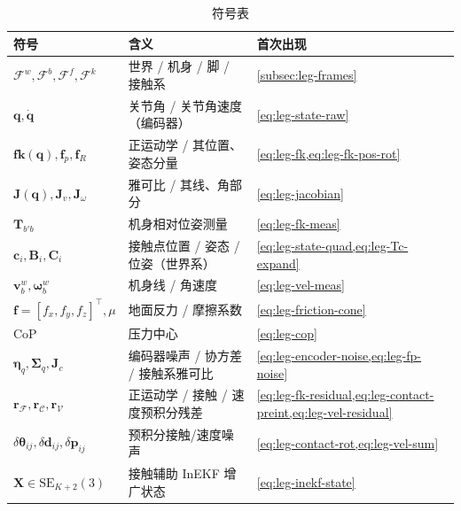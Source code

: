 \begin{table}[H]\centering\small
\caption{符号表}
\begin{tabular}{lll}
\toprule
符号 & 含义 & 首次出现 \\
\midrule
$\mathcal{F}^w,\mathcal{F}^b,\mathcal{F}^f,\mathcal{F}^k$ & 世界 / 机身 / 脚 / 接触系 & \cref{subsec:leg-frames} \\
$\mathbf{q},\dot{\mathbf{q}}$ & 关节角 / 关节角速度（编码器） & \cref{eq:leg-state-raw} \\
$\mathbf{fk}(\mathbf{q}),\mathbf{f}_p,\mathbf{f}_R$ & 正运动学 / 其位置、姿态分量 & \cref{eq:leg-fk,eq:leg-fk-pos-rot} \\
$\mathbf{J}(\mathbf{q}),\mathbf{J}_v,\mathbf{J}_\omega$ & 雅可比 / 其线、角部分 & \cref{eq:leg-jacobian} \\
$\mathbf{T}_{b'b}$ & 机身相对位姿测量 & \cref{eq:leg-fk-meas} \\
$\mathbf{c}_i,\mathbf{B}_i,\mathbf{C}_i$ & 接触点位置 / 姿态 / 位姿（世界系） & \cref{eq:leg-state-quad,eq:leg-Tc-expand} \\
$\mathbf{v}_b^w,\boldsymbol{\omega}_b^w$ & 机身线 / 角速度 & \cref{eq:leg-vel-meas} \\
$\mathbf{f}=[f_x,f_y,f_z]^\top,\mu$ & 地面反力 / 摩擦系数 & \cref{eq:leg-friction-cone} \\
$\mathrm{CoP}$ & 压力中心 & \cref{eq:leg-cop} \\
$\boldsymbol{\eta}_q,\boldsymbol{\Sigma}_q,\mathbf{J}_c$ & 编码器噪声 / 协方差 / 接触系雅可比 & \cref{eq:leg-encoder-noise,eq:leg-fp-noise} \\
$\mathbf{r}_{\mathcal{F}},\mathbf{r}_{\mathcal{C}},\mathbf{r}_{\mathcal{V}}$ & 正运动学 / 接触 / 速度预积分残差 & \cref{eq:leg-fk-residual,eq:leg-contact-preint,eq:leg-vel-residual} \\
$\delta\boldsymbol{\theta}_{ij},\delta\mathbf{d}_{ij},\delta\mathbf{p}_{ij}$ & 预积分接触/速度噪声 & \cref{eq:leg-contact-rot,eq:leg-vel-sum} \\
$\mathbf{X}\in\mathrm{SE}_{K+2}(3)$ & 接触辅助 InEKF 增广状态 & \cref{eq:leg-inekf-state} \\
\bottomrule
\end{tabular}
\end{table}


